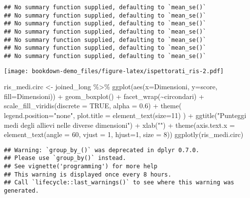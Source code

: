 \documentclass[
]{book}
\newenvironment{Shaded}{\begin{snugshade}}{\end{snugshade}}
\newcommand{\AttributeTok}[1]{\textcolor[rgb]{0.77,0.63,0.00}{#1}}
\newcommand{\ConstantTok}[1]{\textcolor[rgb]{0.00,0.00,0.00}{#1}}
\newcommand{\DecValTok}[1]{\textcolor[rgb]{0.00,0.00,0.81}{#1}}
\newcommand{\FloatTok}[1]{\textcolor[rgb]{0.00,0.00,0.81}{#1}}
\newcommand{\FunctionTok}[1]{\textcolor[rgb]{0.00,0.00,0.00}{#1}}
\newcommand{\NormalTok}[1]{#1}
\newcommand{\OtherTok}[1]{\textcolor[rgb]{0.56,0.35,0.01}{#1}}
\newcommand{\SpecialCharTok}[1]{\textcolor[rgb]{0.00,0.00,0.00}{#1}}
\newcommand{\StringTok}[1]{\textcolor[rgb]{0.31,0.60,0.02}{#1}}
\begin{document}
\begin{verbatim}
## No summary function supplied, defaulting to `mean_se()`
## No summary function supplied, defaulting to `mean_se()`
## No summary function supplied, defaulting to `mean_se()`
## No summary function supplied, defaulting to `mean_se()`
## No summary function supplied, defaulting to `mean_se()`
## No summary function supplied, defaulting to `mean_se()`
## No summary function supplied, defaulting to `mean_se()`
\end{verbatim}

\texttt{[image: bookdown-demo\_files/figure-latex/ispettorati\_ris-2.pdf]}

\begin{Shaded}
\begin{Highlighting}[]
\NormalTok{ris\_medi.circ }\OtherTok{\textless{}{-}}\NormalTok{ joined\_long }\SpecialCharTok{\%\textgreater{}\%}
  \FunctionTok{ggplot}\NormalTok{(}\FunctionTok{aes}\NormalTok{(}\AttributeTok{x=}\NormalTok{Dimensioni, }\AttributeTok{y=}\NormalTok{score, }\AttributeTok{fill=}\NormalTok{Dimensioni)) }\SpecialCharTok{+}
  \FunctionTok{geom\_boxplot}\NormalTok{() }\SpecialCharTok{+}
  \FunctionTok{facet\_wrap}\NormalTok{(}\SpecialCharTok{\textasciitilde{}}\NormalTok{circondari) }\SpecialCharTok{+}
  \FunctionTok{scale\_fill\_viridis}\NormalTok{(}\AttributeTok{discrete =} \ConstantTok{TRUE}\NormalTok{, }\AttributeTok{alpha =} \FloatTok{0.6}\NormalTok{) }\SpecialCharTok{+}
  \FunctionTok{theme}\NormalTok{(}
    \AttributeTok{legend.position=}\StringTok{"none"}\NormalTok{,}
    \AttributeTok{plot.title =} \FunctionTok{element\_text}\NormalTok{(}\AttributeTok{size=}\DecValTok{11}\NormalTok{)}
\NormalTok{  ) }\SpecialCharTok{+}
  \FunctionTok{ggtitle}\NormalTok{(}\StringTok{"Punteggi medi degli allievi nelle diverse dimensioni"}\NormalTok{) }\SpecialCharTok{+}
  \FunctionTok{xlab}\NormalTok{(}\StringTok{""}\NormalTok{) }\SpecialCharTok{+}
  \FunctionTok{theme}\NormalTok{(}\AttributeTok{axis.text.x =} \FunctionTok{element\_text}\NormalTok{(}\AttributeTok{angle =} \DecValTok{60}\NormalTok{, }\AttributeTok{vjust =} \DecValTok{1}\NormalTok{, }\AttributeTok{hjust=}\DecValTok{1}\NormalTok{, }\AttributeTok{size =} \DecValTok{8}\NormalTok{))}
\FunctionTok{ggplotly}\NormalTok{(ris\_medi.circ)}
\end{Highlighting}
\end{Shaded}

\begin{verbatim}
## Warning: `group_by_()` was deprecated in dplyr 0.7.0.
## Please use `group_by()` instead.
## See vignette('programming') for more help
## This warning is displayed once every 8 hours.
## Call `lifecycle::last_warnings()` to see where this warning was generated.
\end{verbatim}
\end{document}
